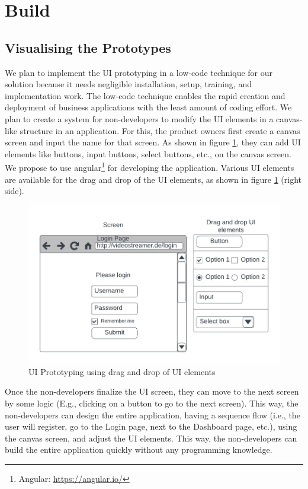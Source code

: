 \section{Build}
\subsection{Visualising the Prototypes} 

We plan to implement the UI prototyping in a low-code technique for our solution because it needs negligible installation, setup, training, and implementation work. 
The low-code technique enables the rapid creation and deployment of business applications with the least amount of coding effort. 
We plan to create a system for non-developers to modify the UI elements in a canvas-like structure in an application. 
For this, the product owners first create a canvas screen and input the name for that screen. 
As shown in figure \ref{solutionideas:fig:uiprototyping}, they can add UI elements like buttons, input buttons, select buttons, etc., on the canvas screen. 
We propose to use angular\footnote{Angular: \url{https://angular.io/}} for developing the application. 
Various UI elements are available for the drag and drop of the UI elements, as shown in figure \ref{solutionideas:fig:uiprototyping} (right side).

\begin{figure}[h]
    \centering
    \includegraphics[scale=0.4]{images/solution-ideas/UIPrototyping.png}
    \caption{UI Prototyping using drag and drop of UI elements}
    \label{solutionideas:fig:uiprototyping}
\end{figure}

Once the non-developers finalize the UI screen, they can move to the next screen by some logic (E.g., clicking on a button to go to the next screen). 
This way, the non-developers can design the entire application, having a sequence flow (i.e., the user will register, go to the Login page, next to the Dashboard page, etc.), using the canvas screen, and adjust the UI elements. 
This way, the non-developers can build the entire application quickly without any programming knowledge. 

